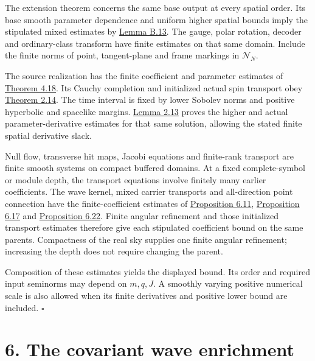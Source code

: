 \documentclass[
  english,
  11pt,
  reqno]{amsart}
\begin{document}
The extension theorem concerns the same base output at every spatial
order. Its base smooth parameter dependence and uniform higher spatial
bounds imply the stipulated mixed estimates by
\hyperref[lem:online-parameter-promotion]{Lemma B.13}. The gauge, polar
rotation, decoder and ordinary-class transform have finite estimates on
that same domain. Include the finite norms of point, tangent-plane and
frame markings in \(\mathcal N_N\).

The source realization has the finite coefficient and parameter
estimates of
\hyperref[thm:online-ordinary-negative-response-initial-source]{Theorem
4.18}. Its Cauchy completion and initialized actual spin transport obey
\hyperref[thm:online-common-collar-finite-families]{Theorem 2.14}. The
time interval is fixed by lower Sobolev norms and positive hyperbolic
and spacelike margins.
\hyperref[lem:online-reduced-cauchy-finite-family-estimates]{Lemma 2.13}
proves the higher and actual parameter-derivative estimates for that
same solution, allowing the stated finite spatial derivative slack.

Null flow, transverse hit maps, Jacobi equations and finite-rank
transport are finite smooth systems on compact buffered domains. At a
fixed complete-symbol or module depth, the transport equations involve
finitely many earlier coefficients. The wave kernel, mixed carrier
transports and all-direction point connection have the
finite-coefficient estimates of
\hyperref[prop:online-wave-kernel-finite-families]{Proposition 6.11},
\hyperref[prop:online-wave-carrier-families-scale]{Proposition 6.17} and
\hyperref[prop:online-point-connection-finite-families]{Proposition
6.22}. Finite angular refinement and those initialized transport
estimates therefore give each stipulated coefficient bound on the same
parents. Compactness of the real sky supplies one finite angular
refinement; increasing the depth does not require changing the parent.

Composition of these estimates yields the displayed bound. Its order and
required input seminorms may depend on \(m,q,J\). A smoothly varying
positive numerical scale is also allowed when its finite derivatives and
positive lower bound are included. \hfill\(\square\)

\section{6. The covariant wave
enrichment}\label{the-covariant-wave-enrichment}\label{sec:online-covariant-wave-enrichment}
\end{document}
